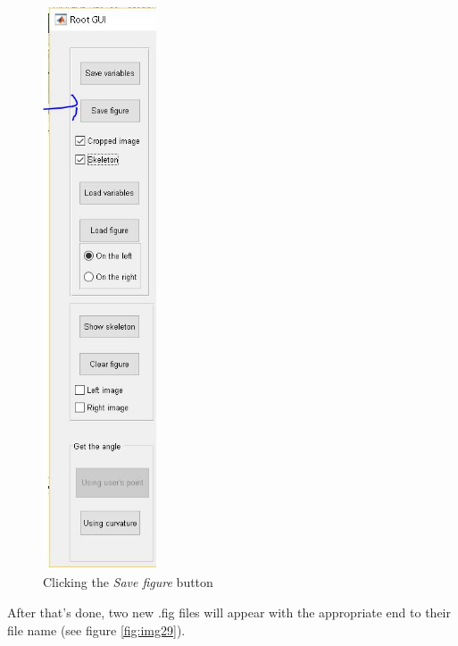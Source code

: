 \begin{figure}[H]
	\centering
	\includegraphics[width=0.3\textwidth]{../Figures/manual/save5.jpg}
	\caption{Clicking the \textit{Save figure} button}
	\label{fig:img28}
\end{figure}

After that's done, two new .fig files will appear with the appropriate end to their file name (see figure \ref{fig:img29}).

